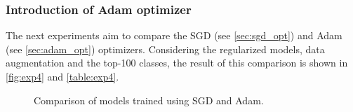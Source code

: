 \subsubsection{Introduction of Adam optimizer}
The next experiments aim to compare the SGD (see \autoref{sec:sgd_opt}) and Adam (see \autoref{sec:adam_opt}) optimizers. Considering the regularized models, data augmentation and the top-100 classes, the result of this comparison is shown in \autoref{fig:exp4} and \autoref{table:exp4}.

\begin{figure}[H]
	\centering
	\caption{Comparison of models trained using SGD and Adam.}%
	\label{fig:exp4}%
\end{figure}

